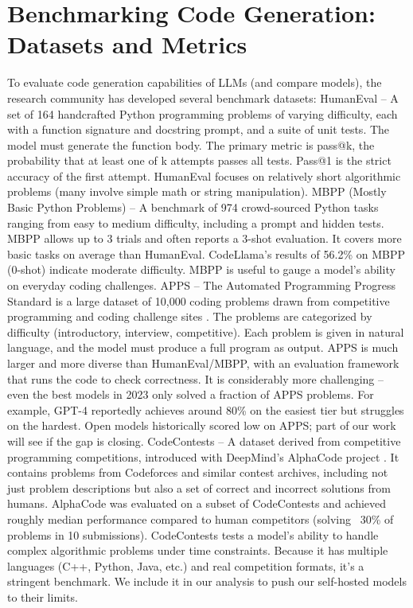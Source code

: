 \section{Benchmarking Code Generation: Datasets and Metrics}
\label{sec:benchmarking-code-generation}
To evaluate code generation capabilities of LLMs (and compare models), the research community has developed several benchmark datasets:
HumanEval \autocite{Chen2021} – A set of 164 handcrafted Python programming problems of varying difficulty, each with a function signature and docstring prompt, and a suite of unit tests​. The model must generate the function body. The primary metric is pass@k, the probability that at least one of k attempts passes all tests. Pass@1 is the strict accuracy of the first attempt. HumanEval focuses on relatively short algorithmic problems (many involve simple math or string manipulation).
MBPP (Mostly Basic Python Problems) – A benchmark of 974 crowd-sourced Python tasks ranging from easy to medium difficulty, including a prompt and hidden tests. MBPP allows up to 3 trials and often reports a 3-shot evaluation. It covers more basic tasks on average than HumanEval. CodeLlama’s results of 56.2\% on MBPP (0-shot) indicate moderate difficulty​. MBPP is useful to gauge a model’s ability on everyday coding challenges.
APPS \autocite{Hendrycks2021} – The Automated Programming Progress Standard is a large dataset of 10,000 coding problems drawn from competitive programming and coding challenge sites \autocite{Hendrycks2021}. The problems are categorized by difficulty (introductory, interview, competitive). Each problem is given in natural language, and the model must produce a full program as output. APPS is much larger and more diverse than HumanEval/MBPP, with an evaluation framework that runs the code to check correctness. It is considerably more challenging – even the best models in 2023 only solved a fraction of APPS problems. For example, GPT-4 reportedly achieves around 80\% on the easiest tier but struggles on the hardest. Open models historically scored low on APPS; part of our work will see if the gap is closing.
CodeContests \autocite{Li2022} – A dataset derived from competitive programming competitions, introduced with DeepMind’s AlphaCode project \autocite{Li2022}. It contains problems from Codeforces and similar contest archives, including not just problem descriptions but also a set of correct and incorrect solutions from humans. AlphaCode was evaluated on a subset of CodeContests and achieved roughly median performance compared to human competitors (solving ~30\% of problems in 10 submissions). CodeContests tests a model’s ability to handle complex algorithmic problems under time constraints. Because it has multiple languages (C++, Python, Java, etc.) and real competition formats, it’s a stringent benchmark. We include it in our analysis to push our self-hosted models to their limits.

